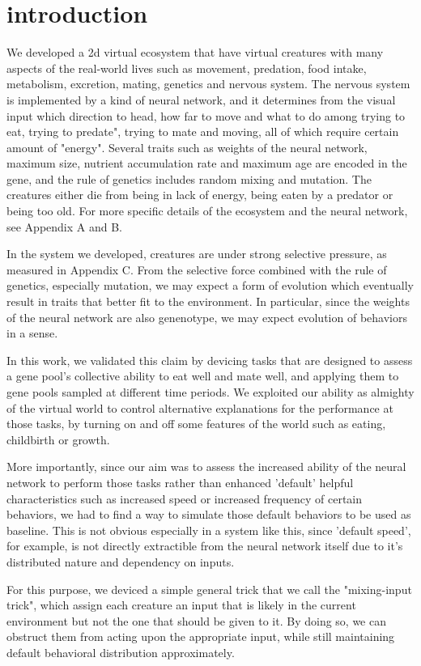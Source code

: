 \documentclass{article}
\numberwithin{equation}{section}
\begin{document}
\section{introduction}
	We developed a 2d virtual ecosystem that have virtual creatures with many aspects of the real-world lives such as movement, predation, food intake, metabolism, excretion, mating, genetics and nervous system. The nervous system is implemented by a kind of neural network, and it determines from the visual input which direction to head, how far to move and what to do among trying to eat, trying to predate",  trying to mate and moving, all of which require certain amount of "energy". Several traits such as weights of the neural network, maximum size, nutrient accumulation rate and maximum age are encoded in the gene, and the rule  of genetics includes random mixing and mutation. The creatures either die from being in lack of energy, being eaten by a predator or being too old. For more specific details of the ecosystem and the neural network, see Appendix A and B.
	
	In the system we developed, creatures are under strong selective pressure, as measured in Appendix C. From the selective force combined with the rule of genetics, especially mutation, we may expect a form of evolution which eventually result in traits that better fit to the environment. In particular, since the weights of the neural network are also genenotype, we may expect evolution of behaviors in a sense. 
	
	In this work, we validated this claim by devicing tasks that are designed to assess a gene pool's collective ability to eat well and mate well, and applying them to gene pools sampled at different time periods. We exploited our ability as almighty of the virtual world to control alternative explanations for the performance at those tasks, by turning on and off some features of the world such as eating, childbirth or growth.
	
	More importantly, since our aim was to assess the increased ability of the neural network to perform those tasks rather than enhanced 'default' helpful characteristics such as increased speed or increased frequency of certain behaviors, we had to find a way to simulate those default behaviors to be used as baseline. This is not obvious especially in a system like this, since 'default speed', for example, is not directly extractible from the neural network itself due to it's distributed nature and dependency on inputs. 
	
	For this purpose, we deviced a simple  general trick that we call the "mixing-input trick", which assign each creature an input that is likely in the current environment but not the one that should be given to it. By doing so, we can obstruct them from acting upon the appropriate input, while still maintaining default behavioral distribution approximately. 
	
\end{document}
